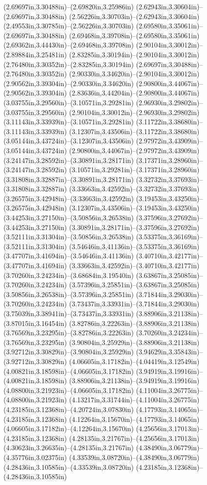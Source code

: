 (2.69697in,3.30488in)--(2.69820in,3.25986in) (2.62943in,3.30604in)--(2.69697in,3.30488in) (2.56226in,3.30703in)--(2.62943in,3.30604in) (2.49553in,3.30785in)--(2.56226in,3.30703in) (2.69580in,3.35061in)--(2.69697in,3.30488in) (2.69468in,3.39708in)--(2.69580in,3.35061in) (2.69362in,3.44430in)--(2.69468in,3.39708in) (2.90104in,3.30012in)--(2.89884in,3.25481in) (2.83285in,3.30194in)--(2.90104in,3.30012in) (2.76480in,3.30352in)--(2.83285in,3.30194in) (2.69697in,3.30488in)--(2.76480in,3.30352in) (2.90330in,3.34620in)--(2.90104in,3.30012in) (2.90562in,3.39304in)--(2.90330in,3.34620in) (2.90800in,3.44067in)--(2.90562in,3.39304in) (2.83636in,3.44204in)--(2.90800in,3.44067in) (3.03755in,3.29560in)--(3.10571in,3.29281in) (2.96930in,3.29802in)--(3.03755in,3.29560in) (2.90104in,3.30012in)--(2.96930in,3.29802in) (3.11143in,3.33939in)--(3.10571in,3.29281in) (3.11722in,3.38680in)--(3.11143in,3.33939in) (3.12307in,3.43506in)--(3.11722in,3.38680in) (3.05144in,3.43724in)--(3.12307in,3.43506in) (2.97972in,3.43909in)--(3.05144in,3.43724in) (2.90800in,3.44067in)--(2.97972in,3.43909in) (3.24147in,3.28592in)--(3.30891in,3.28171in) (3.17371in,3.28960in)--(3.24147in,3.28592in) (3.10571in,3.29281in)--(3.17371in,3.28960in) (3.31808in,3.32887in)--(3.30891in,3.28171in) (3.32732in,3.37693in)--(3.31808in,3.32887in) (3.33663in,3.42592in)--(3.32732in,3.37693in) (3.26575in,3.42948in)--(3.33663in,3.42592in) (3.19453in,3.43250in)--(3.26575in,3.42948in) (3.12307in,3.43506in)--(3.19453in,3.43250in) (3.44253in,3.27150in)--(3.50856in,3.26538in) (3.37596in,3.27692in)--(3.44253in,3.27150in) (3.30891in,3.28171in)--(3.37596in,3.27692in) (3.52111in,3.31304in)--(3.50856in,3.26538in) (3.53375in,3.36169in)--(3.52111in,3.31304in) (3.54646in,3.41136in)--(3.53375in,3.36169in) (3.47707in,3.41694in)--(3.54646in,3.41136in) (3.40710in,3.42177in)--(3.47707in,3.41694in) (3.33663in,3.42592in)--(3.40710in,3.42177in) (3.70260in,3.24234in)--(3.68684in,3.19540in) (3.63867in,3.25085in)--(3.70260in,3.24234in) (3.57396in,3.25851in)--(3.63867in,3.25085in) (3.50856in,3.26538in)--(3.57396in,3.25851in) (3.71844in,3.29030in)--(3.70260in,3.24234in) (3.73437in,3.33931in)--(3.71844in,3.29030in) (3.75039in,3.38941in)--(3.73437in,3.33931in) (3.88906in,3.21138in)--(3.87015in,3.16454in) (3.82786in,3.22263in)--(3.88906in,3.21138in) (3.76569in,3.23295in)--(3.82786in,3.22263in) (3.70260in,3.24234in)--(3.76569in,3.23295in) (3.90804in,3.25929in)--(3.88906in,3.21138in) (3.92712in,3.30829in)--(3.90804in,3.25929in) (3.94629in,3.35843in)--(3.92712in,3.30829in) (4.06605in,3.17182in)--(4.04419in,3.12549in) (4.00821in,3.18598in)--(4.06605in,3.17182in) (3.94919in,3.19916in)--(4.00821in,3.18598in) (3.88906in,3.21138in)--(3.94919in,3.19916in) (4.08800in,3.21923in)--(4.06605in,3.17182in) (4.11004in,3.26775in)--(4.08800in,3.21923in) (4.13217in,3.31744in)--(4.11004in,3.26775in) (4.23185in,3.12368in)--(4.20724in,3.07830in) (4.17793in,3.14065in)--(4.23185in,3.12368in) (4.12264in,3.15670in)--(4.17793in,3.14065in) (4.06605in,3.17182in)--(4.12264in,3.15670in) (4.25656in,3.17013in)--(4.23185in,3.12368in) (4.28135in,3.21767in)--(4.25656in,3.17013in) (4.30623in,3.26635in)--(4.28135in,3.21767in) (4.38490in,3.06779in)--(4.35776in,3.02375in) (4.33539in,3.08720in)--(4.38490in,3.06779in) (4.28436in,3.10585in)--(4.33539in,3.08720in) (4.23185in,3.12368in)--(4.28436in,3.10585in) 